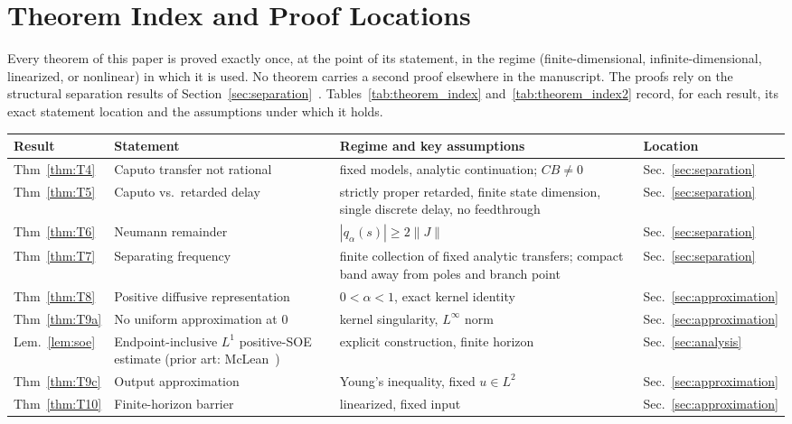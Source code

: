 \section{Theorem Index and Proof Locations}
\label{sec:appendices}

Every theorem of this paper is proved exactly once, at the point of its statement, in the regime (finite-dimensional, infinite-dimensional, linearized, or nonlinear) in which it is used. No theorem carries a second proof elsewhere in the manuscript. The proofs rely on the structural separation results of Section~\ref{sec:separation}~\cite{F02,F03,F04,F08,K01,K02,S01,S02}. Tables~\ref{tab:theorem_index} and~\ref{tab:theorem_index2} record, for each result, its exact statement location and the assumptions under which it holds.

\begin{table}[ht]
  \centering
  \scriptsize
  \begin{tabular}{p{1.15cm}p{2.1cm}p{4.85cm}p{1.95cm}}
    \hline
    Result & Statement & Regime and key assumptions & Location \\
    \hline
    Thm~\ref{thm:T4} & Caputo transfer not rational & fixed models, analytic continuation; $CB\neq 0$ & Sec.~\ref{sec:separation} \\
    Thm~\ref{thm:T5} & Caputo vs.\ retarded delay & strictly proper retarded, finite state dimension, single discrete delay, no feedthrough & Sec.~\ref{sec:separation} \\
    Thm~\ref{thm:T6} & Neumann remainder & $|q_\alpha(s)|\ge 2\|J\|$ & Sec.~\ref{sec:separation} \\
    Thm~\ref{thm:T7} & Separating frequency & finite collection of fixed analytic transfers; compact band away from poles and branch point & Sec.~\ref{sec:separation} \\
    Thm~\ref{thm:T8} & Positive diffusive representation & $0<\alpha<1$, exact kernel identity & Sec.~\ref{sec:approximation} \\
    Thm~\ref{thm:T9a} & No uniform approximation at $0$ & kernel singularity, $L^\infty$ norm & Sec.~\ref{sec:approximation} \\
    Lem.~\ref{lem:soe} & Endpoint-inclusive $L^1$ positive-SOE estimate (prior art: McLean~\cite{K07}) & explicit construction, finite horizon & Sec.~\ref{sec:analysis} \\
    Thm~\ref{thm:T9c} & Output approximation & Young's inequality, fixed $u\in L^2$ & Sec.~\ref{sec:approximation} \\
    Thm~\ref{thm:T10} & Finite-horizon barrier & linearized, fixed input & Sec.~\ref{sec:approximation} \\

\end{tabular}
\end{table}
